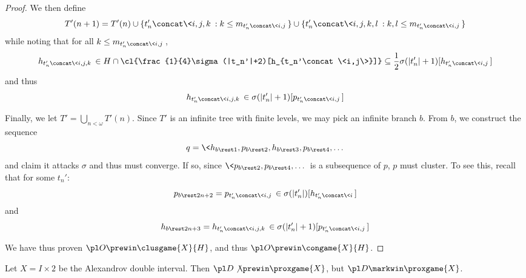 \begin{proof}
  We then define 
  \[
    T'(n+1)
      =
    T'(n)
      \cup
    \{t_n'\concat\<i,j,k\>: k\leq m_{t_n'\concat\<i,j\>}\}
      \cup
    \{t_n'\concat\<i,j,k,l\>: k,l\leq m_{t_n'\concat\<i,j\>}\}
  \]
  while noting that for all $k\leq m_{t_n'\concat\<i,j\>}$,
  \[
    h_{t_n'\concat\<i,j,k\>}
      \in 
    H\cap \cl{\frac{1}{4}\sigma(|t_n'|+2)[h_{t_n'\concat\<i,j\>}]}
      \subseteq 
    \frac{1}{2}\sigma(|t_n'|+1)[h_{t_n'\concat\<i,j\>}]
  \]
  and thus
  \[
    h_{t_n'\concat\<i,j,k\>}\in\sigma(|t_n'|+1)[p_{t_n'\concat\<i,j\>}]
  \]

  Finally, we let $T'=\bigcup_{n<\omega}T'(n)$. Since 
  $T'$ is an infinite tree with finite levels, we may
  pick an infinite branch $b$. From $b$, we construct the sequence
  \[
    q=\<h_{b\rest 1}, p_{b\rest 2}, h_{b\rest 3}, p_{b\rest 4}, \dots\>
  \]
  and claim it attacks $\sigma$ and thus must converge. If so, since 
  $\<p_{b\rest2},p_{b\rest4},\dots\>$ is a subsequence of $p$, $p$ must
  cluster. To see this, recall that for some $t_n'$:
  \[
    p_{b\rest2n+2} 
      =
    p_{t_n'\concat\<i,j\>}
      \in
    \sigma(|t_n'|)[h_{t_n'\concat\<i\>}]
  \]
  and
  \[
    h_{b\rest2n+3}
      =
    h_{t_n'\concat\<i,j,k\>}
      \in
    \sigma(|t_n'|+1)[p_{t_n'\concat\<i,j\>}]
  \]

  We have thus proven $\pl O\prewin\clusgame{X}{H}$, and thus
  $\pl O\prewin\congame{X}{H}$.
\end{proof}











\newpage

\begin{ex}
  Let $X=I\times 2$ be the Alexandrov double interval. Then 
  $\pl D \not\prewin \proxgame{X}$, but $\pl D \markwin \proxgame{X}$.
\end{ex}

